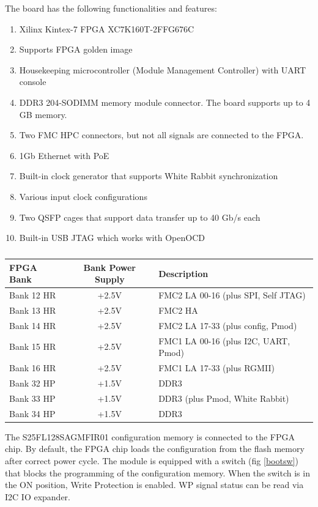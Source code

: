 \documentclass[12pt,oneside,a4]{article}
\begin{document}
The board has the following functionalities and features:
\begin{enumerate}
	\item Xilinx Kintex-7 FPGA XC7K160T-2FFG676C
	\item Supports FPGA golden image
	\item Housekeeping microcontroller (Module Management Controller) with UART console
	\item DDR3 204-SODIMM memory module connector. The board supports up to 4 GB memory.
	\item Two FMC HPC connectors, but not all signals are connected to the FPGA.
	\item 1Gb Ethernet with PoE
	\item Built-in clock generator that supports White Rabbit synchronization
	\item Various input clock configurations
	\item Two QSFP cages that support data transfer up to 40 Gb/s each
	\item Built-in USB JTAG which works with OpenOCD
\end{enumerate}


\begin{table}[htbp]
\centering
\begin{tabular}{@{}lcl@{}}
\toprule
FPGA Bank  & Bank Power Supply & Description \\ \midrule
Bank 12 HR & +2.5V             & FMC2 LA 00-16 (plus SPI, Self JTAG) \\
Bank 13 HR & +2.5V             & FMC2 HA\\
Bank 14 HR & +2.5V             & FMC2 LA 17-33 (plus config, Pmod)\\
Bank 15 HR & +2.5V             & FMC1 LA 00-16 (plus I2C, UART, Pmod)\\
Bank 16 HR & +2.5V             & FMC1 LA 17-33 (plus RGMII)\\
Bank 32 HP & +1.5V             & DDR3        \\
Bank 33 HP & +1.5V             & DDR3 (plus Pmod, White Rabbit) \\
Bank 34 HP & +1.5V             & DDR3       \\ \bottomrule
\end{tabular}
\caption{}
\label{tab:banks}
\end{table}

The S25FL128SAGMFIR01 configuration memory is connected to the FPGA chip. By default, the FPGA chip loads the configuration from the flash memory after correct power cycle. The module is equipped with a switch (fig \ref{bootsw}) that blocks the programming of the configuration memory. When the switch is in the ON position, Write Protection is enabled. WP signal status can be read via I2C IO expander.
\end{document}
